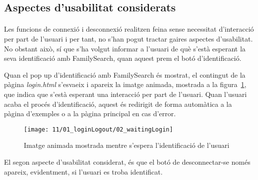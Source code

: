 \subsection{Aspectes d'usabilitat considerats}

    \paragraph{}
    Les funcions de connexió i desconnexió realitzen feina sense necessitat d'interacció per part de l'usuari i per tant, no s'han pogut tractar gaires aspectes d'usabilitat. No obstant això, sí que s'ha volgut informar a l'usuari de què s'està esperant la seva identificació amb FamilySearch, quan aquest prem el botó d'identificació.

    Quan el pop up d'identificació amb FamilySearch és mostrat, el contingut de la pàgina \emph{login.html} s'esvaeix i apareix la imatge animada, mostrada a la figura~\ref{fig:fsLoginWait}, que indica que s'està esperant una interacció per part de l'usuari. Quan l'usuari acaba el procés d'identificació, aquest és redirigit de forma automàtica a la pàgina d'exemples o a la pàgina principal en cas d'error.

    \begin{figure}[h]
        \texttt{[image: 11/01\_loginLogout/02\_waitingLogin]}
        \centering
        \caption{Imatge animada mostrada mentre s'espera l'identificació de l'usuari}\label{fig:fsLoginWait}
    \end{figure}

    El segon aspecte d'usabilitat considerat, és que el botó de desconnectar-se només apareix, evidentment, si l'usuari es troba identificat.
